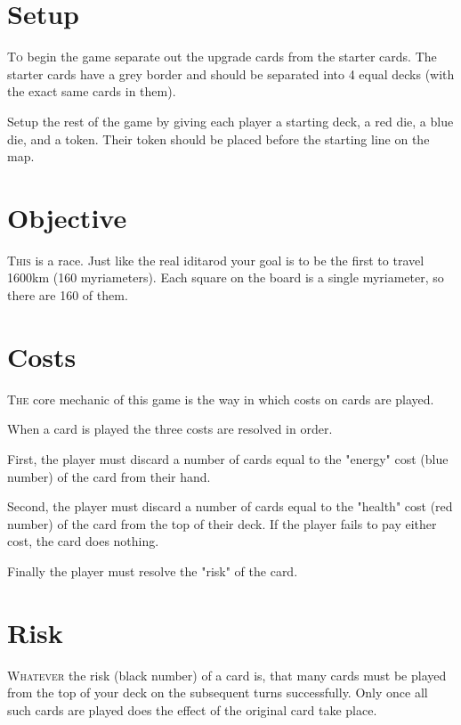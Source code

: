 \documentclass{article}
\begin{document}
\begin{multicols}{3}

\section{Setup}

    \textsc{To} begin the game separate out the upgrade cards from the starter cards.
    The starter cards have a grey border and should be separated into 4 equal
    decks (with the exact same cards in them).

    Setup the rest of the game by giving each player a starting deck, a red die,
    a blue die, and a token. Their token should be placed before the starting
    line on the map.

\section{Objective}

    \textsc{This} is a race. Just like the real iditarod your goal is to be the first to
    travel 1600km (160 myriameters). Each square on the board is a single
    myriameter, so there are 160 of them.

\section{Costs}

    \textsc{The} core mechanic of this game is the way in which costs on cards are
    played.

    When a card is played the three costs are resolved in order.

    First, the player must discard a number of cards equal to the "energy" cost
    (blue number) of the card from their hand.

    Second, the player must discard a number of cards equal to the "health" cost
    (red number) of the card from the top of their deck. If the player fails to
    pay either cost, the card does nothing.

    Finally the player must resolve the "risk" of the card.

\section{Risk}

    \textsc{Whatever} the risk (black number) of a card is, that many cards must be
    played from the top of your deck on the subsequent turns successfully. Only
    once all such cards are played does the effect of the original card take
    place.


\end{multicols}
\end{document}
